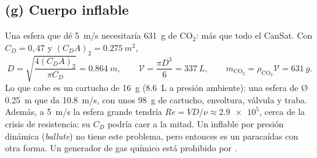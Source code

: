 \subsection{(g) Cuerpo inflable}\label{sec:decision-inf}
Una esfera que dé \SI{5}{m/s} necesitaría \SI{631}{g} de CO$_2$: más que todo el CanSat.
Con $C_D=0{,}47$ y $(C_DA)_2=\SI{0.275}{m^2}$,
\begin{equation}
  D=\sqrt{\frac{4(C_DA)_2}{\pi C_D}}=\SI{0.864}{m},\qquad
  \mathcal{V}=\frac{\pi D^3}{6}=\SI{337}{L},\qquad
  m_{\mathrm{CO_2}}=\rho_{\mathrm{CO_2}}\mathcal{V}=\SI{631}{g}.
  \label{eq:decision-esfera}
\end{equation}
Lo que cabe es un cartucho de \SI{16}{g} (\SI{8.6}{L} a presión ambiente): una esfera de
Ø\,\SI{0.25}{m} que da \SI{10.8}{m/s}, con unos \SI{98}{g} de cartucho, envoltura,
válvula y traba. Además, a \SI{5}{m/s} la esfera grande tendría
$Re=VD/\nu\approx\num{2.9e5}$, cerca de la crisis de resistencia: su $C_D$ podría caer a
la mitad. Un inflable por presión dinámica (\emph{ballute}) no tiene este problema, pero
entonces es un paracaídas con otra forma. Un generador de gas químico está prohibido por
.

